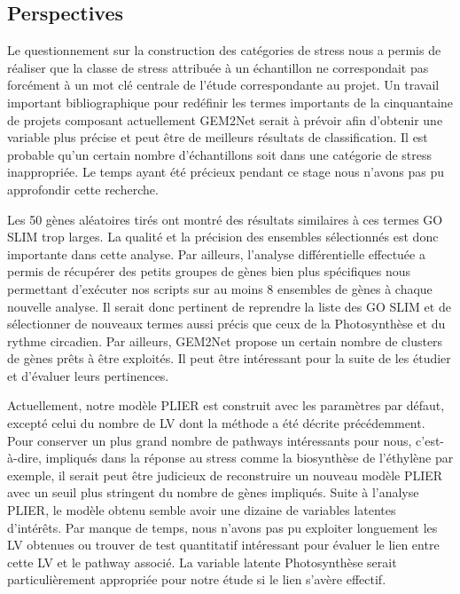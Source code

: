 \documentclass[twoside]{article}
\begin{document}
\subsection{Perspectives}

\vspace{0.5cm}Le questionnement sur la construction des catégories de stress nous a permis de réaliser que la classe de stress attribuée à un échantillon ne correspondait pas forcément à un mot clé centrale de l'étude correspondante au projet. Un travail important bibliographique pour redéfinir les termes importants de la cinquantaine de projets composant actuellement GEM2Net serait à prévoir afin d'obtenir une variable plus précise et peut être de meilleurs résultats de classification. Il est probable qu'un certain nombre d'échantillons soit dans une catégorie de stress inappropriée. Le temps ayant été précieux pendant ce stage nous n'avons pas pu approfondir cette recherche. 

\vspace{0.5cm}Les 50 gènes aléatoires tirés ont montré des résultats similaires à ces termes GO SLIM trop larges. La qualité et la précision des ensembles sélectionnés est donc importante dans cette analyse. Par ailleurs, l'analyse différentielle effectuée a permis de récupérer des petits groupes de gènes bien plus spécifiques nous permettant d'exécuter nos scripts sur au moins 8 ensembles de gènes à chaque nouvelle analyse. Il serait donc pertinent de reprendre la liste des GO SLIM et de sélectionner de nouveaux termes aussi précis que ceux de la Photosynthèse et du rythme circadien. Par ailleurs, GEM2Net propose un certain nombre de clusters de gènes prêts à être exploités. Il peut être intéressant pour la suite de les étudier et d'évaluer leurs pertinences.

\vspace{0.5cm}Actuellement, notre modèle PLIER est construit avec les paramètres par défaut, excepté celui du nombre de LV dont la méthode a été décrite précédemment. Pour conserver un plus grand nombre de pathways intéressants pour nous, c'est-à-dire, impliqués dans la réponse au stress comme la biosynthèse de l'éthylène par exemple, il serait peut être judicieux de reconstruire un nouveau modèle PLIER avec un seuil plus stringent du nombre de gènes impliqués. Suite à l'analyse PLIER, le modèle obtenu semble avoir une dizaine de variables latentes d'intérêts. Par manque de temps, nous n'avons pas pu exploiter longuement les LV obtenues ou trouver de test quantitatif intéressant pour évaluer le lien entre cette LV et le pathway associé. La variable latente Photosynthèse serait particulièrement appropriée pour notre étude si le lien s'avère effectif. 
\end{document}
